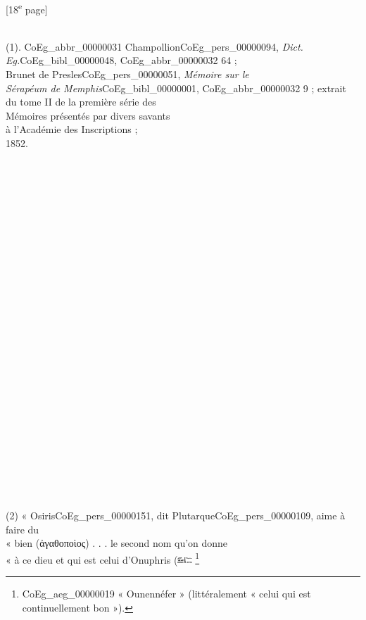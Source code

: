 \documentclass{book}
\begin{document}
{{\footnotesize\begin{center} {[18\textsuperscript{e} page]}\end{center}}

\begin{paracol}{2}
\noindent
\\ (1). \Gls{CoEg_abbr_00000031} Champollion\gls{CoEg_pers_00000094}, \textit{Dict. Eg.}\gls{CoEg_bibl_00000048}, \gls{CoEg_abbr_00000032} 64 ;\\
Brunet de Presles\gls{CoEg_pers_00000051}, \textit{Mémoire sur le\\
Sérapéum de Memphis}\gls{CoEg_bibl_00000001}, \gls{CoEg_abbr_00000032} 9 ; extrait\\
du tome II de la première série des\\
Mémoires présentés par divers savants\\
à l’Académie des Inscriptions ;\\
1852.\\
\\
\\
\\
\\
\\
\\
\\
\\
\\
\\
\\
\\
\\
\\
\\
\\
\\
\\
\\
\\
\\
\\
\\
\\
\\
\\
(2) « Osiris\gls{CoEg_pers_00000151}, dit Plutarque\gls{CoEg_pers_00000109}, aime à faire du\\
« bien (ἀγαθοποὶος) . . . le second nom qu’on donne\\
« à ce dieu et qui est celui d’Onuphris (\includegraphics[height=6pt]{CoEg_Mariette_hiero_1857-04-01_18_2.png} \footnote{\foreignlanguage{translit}{\gls{CoEg_aeg_00000019}} « Ounennéfer » (littéralement « celui qui est continuellement bon »).}

\end{paracol}}
\end{document}
